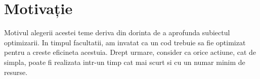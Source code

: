 \chapter*{Motivație} 

Motivul alegerii acestei teme deriva din dorinta de a aprofunda subiectul optimizarii. In timpul facultatii, am invatat ca un cod trebuie sa fie optimizat pentru a creste eficineta acestuia. Drept urmare, consider ca orice actiune, cat de simpla, poate fi realizata intr-un timp cat mai scurt si cu un numar minim  de resurse.